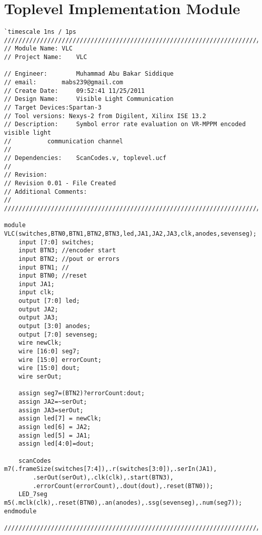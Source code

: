 \section{Toplevel Implementation Module}
\label{sec:vlc}
\begin{lstlisting}[style=verilog-style,basicstyle=\tiny]
`timescale 1ns / 1ps
//////////////////////////////////////////////////////////////////////////////////
// Module Name:	VLC
// Project Name: 	VLC

// Engineer: 		Muhammad Abu Bakar Siddique
// email:		mabs239@gmail.com
// Create Date:  	09:52:41 11/25/2011 
// Design Name: 	Visible Light Communication
// Target Devices:Spartan-3 
// Tool versions: Nexys-2 from Digilent, Xilinx ISE 13.2
// Description: 	Symbol error rate evaluation on VR-MPPM encoded visible light	
//			communication channel
//
// Dependencies: 	ScanCodes.v, toplevel.ucf
//
// Revision: 
// Revision 0.01 - File Created
// Additional Comments: 
//
//////////////////////////////////////////////////////////////////////////////////

module VLC(switches,BTN0,BTN1,BTN2,BTN3,led,JA1,JA2,JA3,clk,anodes,sevenseg);
	input [7:0] switches;
	input BTN3; //encoder start
	input BTN2; //pout or errors
	input BTN1; //
	input BTN0; //reset
	input JA1;
	input clk;
	output [7:0] led;
	output JA2;
	output JA3;
	output [3:0] anodes;
	output [7:0] sevenseg;
	wire newClk;
	wire [16:0] seg7;
	wire [15:0] errorCount;
	wire [15:0] dout;
	wire serOut;

	assign seg7=(BTN2)?errorCount:dout;
	assign JA2=~serOut;
	assign JA3=serOut;
	assign led[7] = newClk;	
	assign led[6] = JA2;	
	assign led[5] = JA1;	
	assign led[4:0]=dout;

	scanCodes m7(.frameSize(switches[7:4]),.r(switches[3:0]),.serIn(JA1),
		.serOut(serOut),.clk(clk),.start(BTN3),
		.errorCount(errorCount),.dout(dout),.reset(BTN0));
	LED_7seg m5(.mclk(clk),.reset(BTN0),.an(anodes),.ssg(sevenseg),.num(seg7));	
endmodule

//////////////////////////////////////////////////////////////////////////////////
\end{lstlisting}


\newpage
